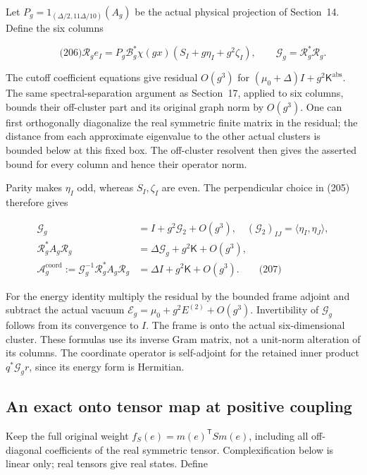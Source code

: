 Let \(P_g=1_{(\Delta/2,11\Delta/10)}(A_g)\) be the actual physical
projection of Section~14. Define the six columns

\[
\qquad\text{(206)}
 \mathcal R_g e_I=P_g\mathcal B_g^*\chi(gx)
                         (S_I+g\eta_I+g^2\zeta_I),\qquad
 \mathcal G_g=\mathcal R_g^*\mathcal R_g.
\]

The cutoff coefficient equations give residual \(O(g^3)\) for
\((\mu_0+\Delta)I+g^2\mathsf K^{\mathrm{abs}}\). The same
spectral-separation argument as Section~17, applied to six columns,
bounds their off-cluster part and its original graph norm by \(O(g^3)\).
One can first orthogonally diagonalize the real symmetric finite matrix
in the residual; the distance from each approximate eigenvalue to the
other actual clusters is bounded below at this fixed box. The
off-cluster resolvent then gives the asserted bound for every column and
hence their operator norm.

Parity makes \(\eta_I\) odd, whereas \(S_I,\zeta_I\) are even. The
perpendicular choice in (205) therefore gives

\[
\begin{aligned}
 \mathcal G_g&=I+g^2\mathcal G_2+O(g^3),\quad
             (\mathcal G_2)_{IJ}=\langle\eta_I,\eta_J\rangle,\\
 \mathcal R_g^*A_g\mathcal R_g
       &=\Delta\mathcal G_g+g^2\mathsf K+O(g^3),\\
 \mathcal A_g^{\mathrm{coord}}
       :=\mathcal G_g^{-1}\mathcal R_g^*A_g\mathcal R_g
       &=\Delta I+g^2\mathsf K+O(g^3).
 \qquad\text{(207)}
\end{aligned}
\]

For the energy identity multiply the residual by the bounded frame
adjoint and subtract the actual vacuum
\(\mathcal E_g=\mu_0+g^2E^{(2)}+O(g^3)\). Invertibility of
\(\mathcal G_g\) follows from its convergence to \(I\). The frame is
onto the actual six-dimensional cluster. These formulas use its inverse
Gram matrix, not a unit-norm alteration of its columns. The coordinate
operator is self-adjoint for the retained inner product
\(q^*\mathcal G_g r\), since its energy form is Hermitian.

\subsection{An exact onto tensor map at positive
coupling}\label{interacting-tensor-band-md-an-exact-onto-tensor-map-at-positive-coupling}

Keep the full original weight \(f_S(e)=m(e)^{\mathsf T}S m(e)\),
including all off-diagonal coefficients of the real symmetric tensor.
Complexification below is linear only; real tensors give real states.
Define

